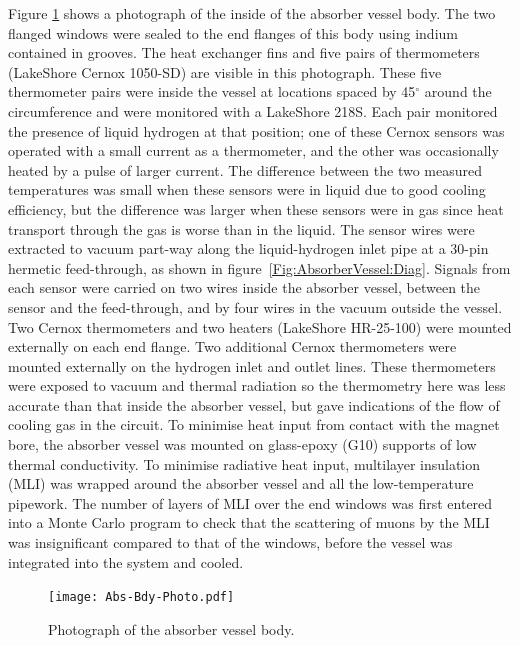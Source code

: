 Figure \ref{Fig:AbsorberVessel:BdyPhoto} shows a photograph of the inside of the
absorber vessel body.   
The two flanged windows were sealed to the end flanges of this
body using indium contained in grooves. 
The heat exchanger fins and five pairs of thermometers (LakeShore Cernox 1050-SD)
are visible in this photograph. 
These five thermometer pairs were inside the vessel at locations spaced by 45$^{\circ}$ around
the circumference and were monitored with a LakeShore 218S.
Each pair monitored the presence of liquid hydrogen at that position;
one of these Cernox sensors was operated with a small current as a
thermometer, and the other was occasionally heated by a pulse of larger current.
The difference between the two measured temperatures was small when these sensors
were in liquid due to good cooling efficiency, but the difference was
larger when these sensors were in gas since heat transport through the
gas is worse than in the liquid.
The sensor wires were extracted to vacuum part-way along the
liquid-hydrogen inlet pipe at a 30-pin hermetic feed-through, as
shown in figure~\ref{Fig:AbsorberVessel:Diag}.
Signals from each sensor were carried on two wires inside the absorber
vessel, between the sensor and the feed-through, and by four wires in
the vacuum outside the vessel.
Two Cernox thermometers and two heaters (LakeShore HR-25-100) were
mounted externally on each end flange.
Two additional Cernox
thermometers were mounted externally on the hydrogen inlet and outlet lines.
These thermometers were exposed to vacuum and thermal radiation so the thermometry
here was less accurate than that inside the absorber vessel, but gave indications
of the flow of cooling gas in the circuit. 
To minimise heat input from contact with the magnet bore, the absorber vessel was
mounted on glass-epoxy (G10) supports of low thermal conductivity.
To minimise radiative heat input, multilayer
insulation (MLI) was wrapped around the absorber vessel and all
the low-temperature pipework. 
The number of layers of MLI over the end windows was first entered
into a Monte Carlo program to check that the scattering of muons by
the MLI was insignificant compared to that of the windows, before the
vessel was integrated into the system and cooled.
\begin{figure}
  \begin{center}
    \texttt{[image: Abs-Bdy-Photo.pdf]}
  \end{center}
  \caption{
    Photograph of the absorber vessel body.
  }
  \label{Fig:AbsorberVessel:BdyPhoto}
\end{figure}

